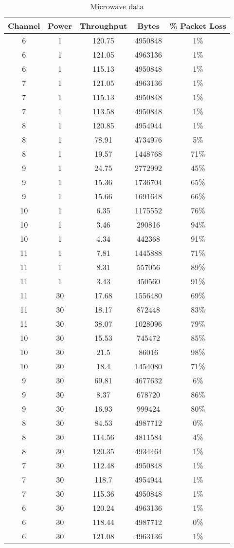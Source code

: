 \documentclass[11pt]{article}
\begin{document}
\begin{table}[h]
\centering
\begin{tabular}{c c c c c}
Channel & Power & Throughput & Bytes & \% Packet Loss \\
\hline
6 & 1 & 120.75 & 4950848 & 1\% \\
6 & 1 & 121.05 & 4963136 & 1\% \\
6 & 1 & 115.13 & 4950848 & 1\% \\
7 & 1 & 121.05 & 4963136 & 1\% \\
7 & 1 & 115.13 & 4950848 & 1\% \\
7 & 1	 & 113.58 & 4950848 & 1\% \\
8 & 1 & 120.85 & 4954944 & 1\% \\
8 & 1 & 78.91 & 4734976 & 5\% \\
8 & 1 & 19.57 & 1448768 & 71\% \\
9 & 1 & 24.75 & 2772992 & 45\% \\
9 & 1 & 15.36 & 1736704 & 65\% \\
9 & 1 & 15.66 & 1691648 & 66\% \\
10 & 1 & 6.35 & 1175552 & 76\% \\
10 & 1 & 3.46 & 290816 & 94\% \\
10 & 1 & 4.34 & 442368 & 91\% \\
11 & 1 & 7.81 & 1445888 & 71\% \\
11 & 1 & 8.31 & 557056 & 89\% \\
11 & 1 & 3.43 & 450560 & 91\% \\
11 & 30 & 17.68 & 1556480 & 69\% \\
11 & 30 & 18.17 & 872448 & 83\% \\
11 & 30 & 38.07 & 1028096 & 79\% \\
10 & 30 & 15.53 & 745472 & 85\% \\
10 & 30 & 21.5 & 86016 & 98\% \\
10 & 30 & 18.4 & 1454080 & 71\% \\
9 & 30 & 69.81 & 4677632 & 6\% \\
9 & 30 & 8.37 & 678720 & 86\% \\
9 & 30 & 16.93 & 999424 & 80\% \\
8 & 30 & 84.53 & 4987712 & 0\% \\
8 & 30 & 114.56 & 4811584 & 4\% \\
8 & 30 & 120.35 & 4934464 & 1\% \\
7 & 30 & 112.48 & 4950848 & 1\% \\
7 & 30 & 118.7 & 4954944 & 1\% \\
7 & 30 & 115.36 & 4950848 & 1\% \\
6 & 30 & 120.24 & 4963136 & 1\% \\
6 & 30 & 118.44 & 4987712 & 0\% \\
6 & 30 & 121.08 & 4963136 & 1\% \\
\end{tabular}
\caption{Microwave data}
\label{microwave-data}
\end{table}
\end{document}
